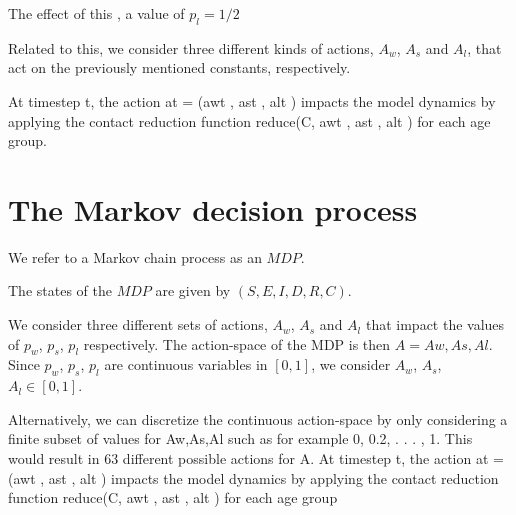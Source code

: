 
The effect of this  , a value of $p_l=1/2$ 

Related to this, we consider three different kinds of actions, $A_w$, $A_s$ and $A_l$, that act on the previously mentioned constants, respectively. 



At
timestep t, the action at = (awt , ast , alt ) impacts the model dynamics by applying
the contact reduction function reduce(C, awt , ast , alt ) for each age group.





\section{The Markov decision process}

We refer to a Markov chain process as an $MDP$.

The states of the $MDP$ are given by $(S,E,I,D,R,C)$.

We consider three different sets of actions, $A_w$, $A_s$ and $A_l$ that impact the values of $p_w$, $p_s$, $p_l$ respectively. The action-space of the MDP is then $A ={Aw,As,Al}$. Since $p_w$, $p_s$, $p_l$ are continuous variables in $[0, 1]$, we consider $A_w$, $A_s$, $A_l \in [0, 1]$.



Alternatively, we can discretize the continuous action-space
by only considering a finite subset of values for Aw,As,Al such as for example
{0, 0.2, . . . , 1}. This would result in 63 different possible actions for A. At
timestep t, the action at = (awt , ast , alt ) impacts the model dynamics by applying
the contact reduction function reduce(C, awt , ast , alt ) for each age group



